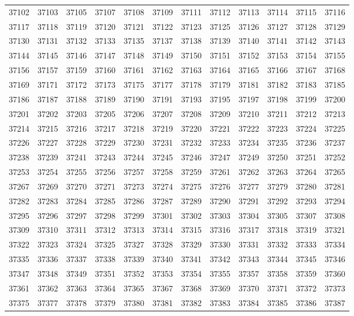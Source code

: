 \begin{center}
\begin{longtable}{llllllllllll}
37102 &37103 &37105 &37107 &37108 &37109 &37111 &37112 &37113 &37114 &37115 &37116 \\
37117 &37118 &37119 &37120 &37121 &37122 &37123 &37125 &37126 &37127 &37128 &37129 \\
37130 &37131 &37132 &37133 &37135 &37137 &37138 &37139 &37140 &37141 &37142 &37143 \\
37144 &37145 &37146 &37147 &37148 &37149 &37150 &37151 &37152 &37153 &37154 &37155 \\
37156 &37157 &37159 &37160 &37161 &37162 &37163 &37164 &37165 &37166 &37167 &37168 \\
37169 &37171 &37172 &37173 &37175 &37177 &37178 &37179 &37181 &37182 &37183 &37185 \\
37186 &37187 &37188 &37189 &37190 &37191 &37193 &37195 &37197 &37198 &37199 &37200 \\
37201 &37202 &37203 &37205 &37206 &37207 &37208 &37209 &37210 &37211 &37212 &37213 \\
37214 &37215 &37216 &37217 &37218 &37219 &37220 &37221 &37222 &37223 &37224 &37225 \\
37226 &37227 &37228 &37229 &37230 &37231 &37232 &37233 &37234 &37235 &37236 &37237 \\
37238 &37239 &37241 &37243 &37244 &37245 &37246 &37247 &37249 &37250 &37251 &37252 \\
37253 &37254 &37255 &37256 &37257 &37258 &37259 &37261 &37262 &37263 &37264 &37265 \\
37267 &37269 &37270 &37271 &37273 &37274 &37275 &37276 &37277 &37279 &37280 &37281 \\
37282 &37283 &37284 &37285 &37286 &37287 &37289 &37290 &37291 &37292 &37293 &37294 \\
37295 &37296 &37297 &37298 &37299 &37301 &37302 &37303 &37304 &37305 &37307 &37308 \\
37309 &37310 &37311 &37312 &37313 &37314 &37315 &37316 &37317 &37318 &37319 &37321 \\
37322 &37323 &37324 &37325 &37327 &37328 &37329 &37330 &37331 &37332 &37333 &37334 \\
37335 &37336 &37337 &37338 &37339 &37340 &37341 &37342 &37343 &37344 &37345 &37346 \\
37347 &37348 &37349 &37351 &37352 &37353 &37354 &37355 &37357 &37358 &37359 &37360 \\
37361 &37362 &37363 &37364 &37365 &37367 &37368 &37369 &37370 &37371 &37372 &37373 \\
37375 &37377 &37378 &37379 &37380 &37381 &37382 &37383 &37384 &37385 &37386 &37387 \\

\end{longtable}
\end{center}
